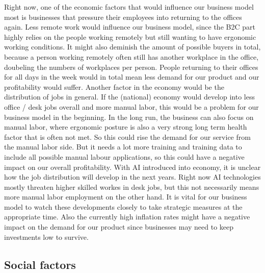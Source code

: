 Right now, one of the economic factors that would influence our business model most is businesses that pressure their employees into returning to the offices again. Less remote work would influence our business model, since the B2C part highly relies on the people working remotely but still wanting to have ergonomic working conditions. It might also deminish the amount of possible buyers in total, because a person working remotely often still has another workplace in the office, doubeling the numbers of workplaces per person. People returning to their offices for all days in the week would in total mean less demand for our product and our profitability would suffer. Another factor in the economy would be the distribution of jobs in general. If the (national) economy would develop into less office / desk jobs overall and more manual labor, this would be a problem for our business model in the beginning. In the long run, the business can also focus on manual labor, where ergonomic posture is also a very strong long term health factor that is often not met. So this could rise the demand for our service from the manual labor side. But it needs a lot more training and training data to include all possible manual labour applications, so this could have a negative impact on our overall profitability. With AI introduced into economy, it is unclear how the job distribution will develop in the next years. Right now AI technologies mostly threaten higher skilled workes in desk jobs, but this not necessarily means more manual labor employment on the other hand. It is vital for our business model to watch these developments closely to take strategic measures at the appropriate time. Also the currently high inflation rates might have a negative impact on the demand for our product since businesses may need to keep investments low to survive. 

\subsection{Social factors}

